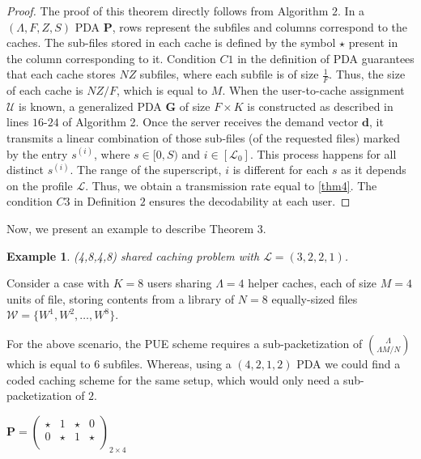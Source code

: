 \documentclass[conference,a4paper,10pt]{IEEEtran}
\newtheorem{example}{Example}
\begin{document}
\begin{proof}
	The proof of this theorem directly follows from Algorithm $2$. In a $(\Lambda,F,Z,S)$ PDA $\mathbf{P}$, rows represent the subfiles and columns correspond to the caches. The sub-files stored in each cache is defined by the symbol $\star$ present in the column corresponding to it. Condition $C1$ in the definition of PDA guarantees that each cache stores $NZ$ subfiles, where each subfile is of size $\frac{1}{F}$. Thus, the size of each cache is $NZ/F$, which is equal to $M$. When the user-to-cache assignment $\mathcal{U}$ is known, a generalized PDA $\mathbf{G}$ of size $F \times K$ is constructed as described in lines $16$-$24$ of Algorithm 2. Once the server receives the demand vector $\mathbf{d}$, it transmits a linear combination of those sub-files (of the requested files) marked by the entry $s^{(i)}$, where $s \in [0,S)$ and $i \in [\mathcal{L}_0]$. This process happens for all distinct $s^{(i)}$. The range of the superscript, $i$ is different for each $s$ as it depends on the profile $\mathcal{L}$. Thus, we obtain a transmission rate equal to \eqref{thm4}. The condition $C3$ in Definition $2$ ensures the decodability at each user. 
\end{proof}
\vspace{-0.1cm}
Now, we present an example to describe Theorem 3.\vspace{-0.2cm}
\begin{example} (4,8,4,8) shared caching problem with $\mathcal{L}=(3,2,2,1)$.
\end{example}

Consider a case with $K=8$ users sharing $\Lambda=4$ helper caches, each of size $M=4$ units of file, storing contents from a library of $N=8$ equally-sized files $\mathcal{W}=\{W^1, W^2,\ldots, W^8\}$. 

For the above scenario, the PUE scheme requires a sub-packetization of $\binom{\Lambda}{{\Lambda M}/{N}}$ which is equal to $6$ subfiles. Whereas, using a $(4,2,1,2)$ PDA we could find a coded caching scheme for the same setup, which would only need a sub-packetization of $2$. 

\begin{center}
	$ \mathbf{P} =
	\begin{pmatrix}
	\star & 1 & \star  & 0 \\
	0 & \star  & 1 & \star \\
	
\end{pmatrix}_{2 \times 4}$

\end{center}
\end{document}
